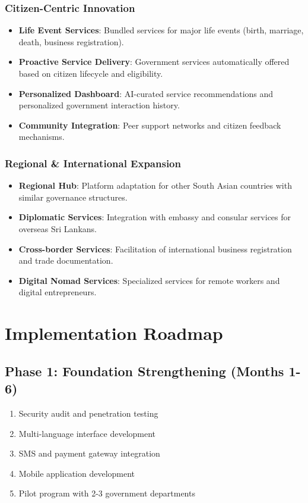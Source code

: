 \documentclass[12pt,a4paper]{article}
\begin{document}
\subsubsection{Citizen-Centric Innovation}
\begin{itemize}[leftmargin=*]
    \item \textbf{Life Event Services}: Bundled services for major life events (birth, marriage, death, business registration).
    \item \textbf{Proactive Service Delivery}: Government services automatically offered based on citizen lifecycle and eligibility.
    \item \textbf{Personalized Dashboard}: AI-curated service recommendations and personalized government interaction history.
    \item \textbf{Community Integration}: Peer support networks and citizen feedback mechanisms.
\end{itemize}

\subsubsection{Regional \& International Expansion}
\begin{itemize}[leftmargin=*]
    \item \textbf{Regional Hub}: Platform adaptation for other South Asian countries with similar governance structures.
    \item \textbf{Diplomatic Services}: Integration with embassy and consular services for overseas Sri Lankans.
    \item \textbf{Cross-border Services}: Facilitation of international business registration and trade documentation.
    \item \textbf{Digital Nomad Services}: Specialized services for remote workers and digital entrepreneurs.
\end{itemize}

\section{Implementation Roadmap}

\subsection{Phase 1: Foundation Strengthening (Months 1-6)}
\begin{enumerate}[leftmargin=*]
    \item Security audit and penetration testing
    \item Multi-language interface development
    \item SMS and payment gateway integration
    \item Mobile application development
    \item Pilot program with 2-3 government departments
\end{enumerate}
\end{document}
